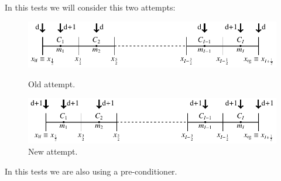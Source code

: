 \documentclass[12pt,a4paper]{article}
\author{Hélder Cruz}
\begin{document}
In this tests we will consider this two attempts:
\begin{figure}[h]
\centering
\includegraphics[width=\textwidth]{images/mesh_scheme_d_plus_1_old/mesh_scheme_d_plus_1_old}
\caption{Old attempt.}
\includegraphics[width=\textwidth]{images/mesh_scheme_d_plus_1_new/mesh_scheme_d_plus_1_new}
\caption{New attempt.}
\end{figure}
\vspace{-0.5cm}

In this tests we are also using a pre-conditioner.
\end{document}
